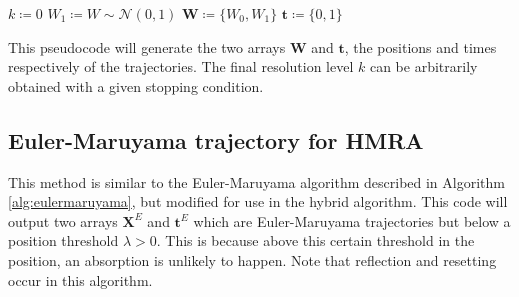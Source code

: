 \documentclass[preprint,12pt]{elsarticle}
\numberwithin{equation}{section}
\theoremstyle{plain} \newtheorem{theorem}{Theorem}[section]
\theoremstyle{plain} \newtheorem{proposition}[theorem]{Proposition}
\theoremstyle{plain} \newtheorem{lemma}[theorem]{Lemma}
\theoremstyle{plain} \newtheorem{corollary}[theorem]{Corollary}
\theoremstyle{definition} \newtheorem{definition}[theorem]{Definition}
\theoremstyle{definition} \newtheorem{notation}[theorem]{Notation}
\theoremstyle{remark} \newtheorem{remark}[theorem]{Remark}
\theoremstyle{remark} \newtheorem{remarks}[theorem]{Remarks}
\theoremstyle{remark} \newtheorem{algorithm2}[theorem]{Algorithm}
\theoremstyle{remark} \newtheorem{example}[theorem]{Example}
\begin{document}
\begin{appendices}
\begin{algorithm}
\caption{Basic MRA}
\label{alg:basicmultires}
$k \coloneqq 0$ \;
$W_1 \coloneqq W \sim \mathcal{N}(0,1)$ \;
$\mathbf{W} \coloneqq \{W_{0}, W_{1}\}$ \;
$\mathbf{t} \coloneqq \{0,1 \}$ \;
\end{algorithm}

This pseudocode will generate the two arrays $\mathbf{W}$ and $\mathbf{t}$, 
the positions and times respectively of the trajectories. 
The final resolution level $k$ can be arbitrarily obtained 
with a given stopping condition.

\newpage
\subsection{Euler-Maruyama trajectory for HMRA}
\label{sec:appendix2}

This method is similar to the Euler-Maruyama algorithm described in Algorithm \ref{alg:eulermaruyama}, but modified for use in the hybrid algorithm. This code will output two arrays $\mathbf{X}^E$ and $\mathbf{t}^E$ which are Euler-Maruyama trajectories but below a position threshold $\lambda>0$. This is because above this certain threshold in the position, an absorption is unlikely to happen. Note that reflection and resetting occur in this algorithm.

\vspace{5mm}


\end{appendices}
\end{document}
